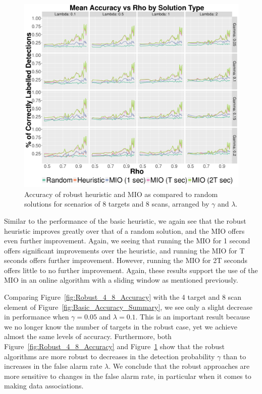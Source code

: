 \begin{figure}[ht]
  \centering
  \includegraphics[width=\columnwidth]{../Figures/8_8_Accuracy}
  \caption{Accuracy of robust heuristic and MIO as compared to random solutions for scenarios of 8 targets and 8 scans, arranged by $\gamma$ and $\lambda$.}
  \label{fig:Robust_8_8_Accuracy}
\end{figure}

Similar to the performance of the basic heuristic, we again see that the robust heuristic improves greatly over that of a random solution, and the MIO offers even further improvement. Again, we seeing that running the MIO for 1 second offers significant improvements over the heuristic, and running the MIO for T seconds offers further improvement. However, running the MIO for 2T seconds offers little to no further improvement. Again, these results support the use of the MIO in an online algorithm with a sliding window as mentioned previously. 

Comparing Figure~\ref{fig:Robust_4_8_Accuracy} with the 4 target and 8 scan element of Figure~\ref{fig:Basic_Accuracy_Summary}, we see only a slight decrease in performance when $\gamma = 0.05$ and $\lambda=0.1$. This is an important result because we no longer know the number of targets in the robust case, yet we achieve almost the same levels of accuracy. Furthermore, both Figure~\ref{fig:Robust_4_8_Accuracy} and Figure~\ref{fig:Robust_8_8_Accuracy} show that the robust algorithms are more robust to decreases in the detection probability $\gamma$ than to increases in the false alarm rate $\lambda$. We conclude that the robust approaches are more sensitive to changes in the false alarm rate, in particular when it comes to making data associations. 


